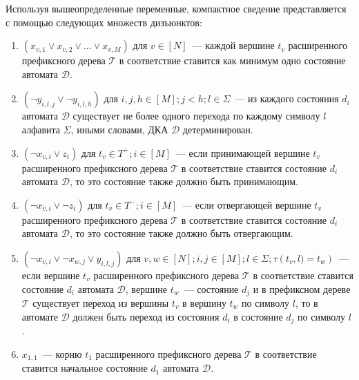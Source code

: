 Используя вышеопределенные переменные, компактное сведение представляется с помощью следующих множеств дизъюнктов:
\begin{enumerate}
  \item $\left(x_{v,1} \vee x_{v,2} \vee \ldots \vee x_{v,M}\right)$ для $v \in \left[N\right]$~{---} каждой вершине $t_{v}$ расширенного префиксного дерева $\mathcal{T} $ в соответствие ставится как минимум одно состояние автомата $\mathcal{D}$.
  \item $\left(\neg y_{i,l,j} \vee \neg y_{i,l,h}\right)$ для $i,j,h \in \left[M\right]; j < h; l \in \Sigma$~{---} из каждого состояния $d_{i}$ автомата $\mathcal{D}$ существует не более одного перехода по каждому символу $l$ алфавита $\Sigma$, иными словами, ДКА $\mathcal{D}$ детерминирован.
  \item $\left(\neg x_{v,i} \vee z_{i}\right)$ для $t_{v} \in T^{+}; i \in \left[M\right]$~{---} если принимающей вершине $t_{v}$ расширенного префиксного дерева $\mathcal{T}$ в соответствие ставится состояние $d_{i}$ автомата $\mathcal{D}$, то это состояние также должно быть принимающим.
  \item $\left(\neg x_{v,i} \vee \neg z_{i}\right)$ для $t_{v} \in T^{-}; i \in \left[M\right]$~{---} если отвергающей вершине $t_{v}$ расширенного префиксного дерева $\mathcal{T}$ в соответствие ставится состояние $d_{i}$ автомата $\mathcal{D}$, то это состояние также должно быть отвергающим.
  \item $\left(\neg x_{v,i} \vee \neg x_{w,j} \vee y_{i,l,j}\right)$ для $v,w \in \left[N\right]; i,j \in \left[M\right];l \in \Sigma; \tau\left(t_{v},l) = t_{w}\right)$~{---} если вершине $t_{v}$ расширенного префиксного дерева $\mathcal{T} $ в соответствие ставится состояние $d_{i}$ автомата $\mathcal{D}$, вершине $t_{w}$~{---} состояние $d_{j}$ и в префиксном дереве $\mathcal{T}$ существует переход из вершины $t_{v}$ в вершину $t_{w}$ по символу $l$, то в автомате $\mathcal{D}$ должен быть переход из состояния $d_{i}$ в состояние $d_{j}$ по символу $l$.
  \item $x_{1,1}$~{---} корню $t_{1}$ расширенного префиксного дерева $\mathcal{T} $ в соответствие ставится начальное состояние $d_{1}$ автомата $\mathcal{D}$.
\end{enumerate}


